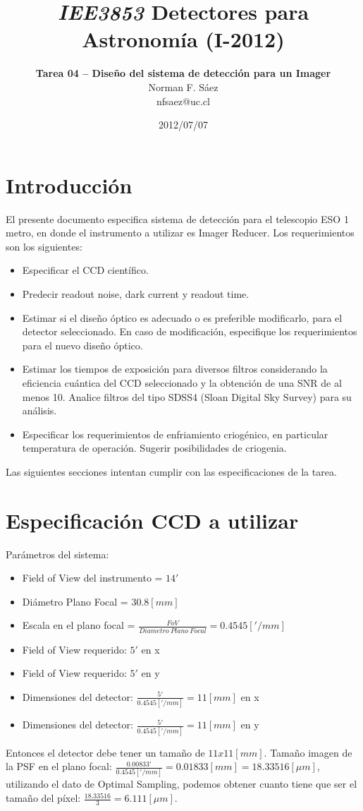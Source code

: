 \documentclass[a4paper,10pt]{article}
\title{\textit{IEE3853} Detectores para Astronomía (I-2012)}
\author{\textbf{Tarea 04 – Diseño del sistema de detección para un Imager} \\Norman F. Sáez\\nfsaez@uc.cl}
\date{2012/07/07}
\begin{document}
%
\maketitle
\section*{Introducción}

El presente documento especifica sistema de detección para el telescopio ESO 1
metro, en donde el instrumento a utilizar es Imager Reducer.  Los requerimientos
son los siguientes:

\begin{itemize}
\item Especificar el CCD científico.

\item Predecir readout noise, dark current y readout time.

\item Estimar si el diseño óptico es adecuado o es preferible modificarlo, para
el detector seleccionado. En caso de modificación, especifique los
requerimientos para el nuevo diseño óptico.

\item Estimar los tiempos de exposición para diversos filtros considerando la
eficiencia cuántica del CCD seleccionado y la obtención de una SNR de al menos
10. Analice filtros del tipo SDSS4 (Sloan Digital Sky Survey) para su análisis.

\item Especificar los requerimientos de enfriamiento criogénico, en particular
temperatura de operación. Sugerir posibilidades de criogenia.
\end{itemize}

Las siguientes secciones intentan cumplir con las especificaciones de la tarea.


\section{Especificación CCD a utilizar}
Parámetros del sistema:
\begin{itemize}
\item Field of View del instrumento = $14 '$
\item Diámetro Plano Focal = $30.8 [mm]$
\item Escala en el plano focal = $\frac{FoV}{Diametro\ Plano\ Focal} = 0.4545 ['/mm]$
\item Field of View requerido: $5'$ en x
\item Field of View requerido: $5'$ en y
\item Dimensiones del detector: $\frac{5'}{0.4545['/mm]} = 11 [mm]$ en x
\item Dimensiones del detector: $\frac{5'}{0.4545['/mm]} = 11 [mm]$ en y
\end{itemize}
Entonces el detector debe tener un tamaño de $11x11[mm]$.  Tamaño imagen de la
PSF en el plano focal: $\frac{0.00833'}{0.4545 ['/mm]} = 0.01833[mm] = 18.33516
[\mu m]$, utilizando el dato de Optimal Sampling, podemos obtener cuanto tiene
que ser el tamaño del píxel: $\frac{18.33516}{3} = 6.111 [\mu m]$.
\end{document}
